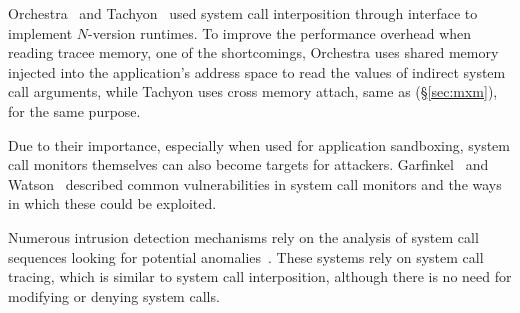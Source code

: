 Orchestra~\cite{orchestra09} and Tachyon~\cite{tachyon12} used system call
interposition through \ptrace interface to implement $N$-version runtimes.  To
improve the performance overhead when reading tracee memory, one of the \ptrace
shortcomings, Orchestra uses shared memory injected into the application's
address space to read the values of indirect system call arguments, while
Tachyon uses cross memory attach, same as \mx (\S\ref{sec:mxm}), for the same
purpose.

Due to their importance, especially when used for application sandboxing,
system call monitors themselves can also become targets for attackers.
Garfinkel~\cite{garfinkel:traps} and Watson~\cite{watson07} described common
vulnerabilities in system call monitors and the ways in which these could be
exploited.

Numerous intrusion detection mechanisms rely on the analysis of system call
sequences looking for potential
anomalies~\cite{syscall-seq,wespi00,sekar01,gao04,sandeep06}. These systems
rely on system call tracing, which is similar to system call interposition,
although there is no need for modifying or denying system calls.





